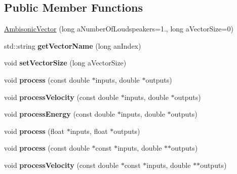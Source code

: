 \subsection*{Public Member Functions}
\begin{DoxyCompactItemize}
\item 
\hyperlink{class_ambisonic_vector_ae4c02b111015ca551b50676e9989e5e1}{Ambisonic\-Vector} (long a\-Number\-Of\-Loudspeakers=1., long a\-Vector\-Size=0)
\item 
\hypertarget{class_ambisonic_vector_aa6057320355238b4afbd1fa2293aca6e}{std\-::string {\bfseries get\-Vector\-Name} (long an\-Index)}\label{class_ambisonic_vector_aa6057320355238b4afbd1fa2293aca6e}

\item 
\hypertarget{class_ambisonic_vector_a63af1b74b95a54082cf318d26ee919b9}{void {\bfseries set\-Vector\-Size} (long a\-Vector\-Size)}\label{class_ambisonic_vector_a63af1b74b95a54082cf318d26ee919b9}

\item 
\hypertarget{class_ambisonic_vector_abc045ea322659b1441d9f5b764950b43}{void {\bfseries process} (const double $\ast$inputs, double $\ast$outputs)}\label{class_ambisonic_vector_abc045ea322659b1441d9f5b764950b43}

\item 
\hypertarget{class_ambisonic_vector_ac3c2eb9b1d2a69ad961ab4256f6fe972}{void {\bfseries process\-Velocity} (const double $\ast$inputs, double $\ast$outputs)}\label{class_ambisonic_vector_ac3c2eb9b1d2a69ad961ab4256f6fe972}

\item 
\hypertarget{class_ambisonic_vector_a6c583cac87046e36245e8cb9e7786855}{void {\bfseries process\-Energy} (const double $\ast$inputs, double $\ast$outputs)}\label{class_ambisonic_vector_a6c583cac87046e36245e8cb9e7786855}

\item 
\hypertarget{class_ambisonic_vector_a3db1780373d30e0d699ea5150b70a0a4}{void {\bfseries process} (float $\ast$inputs, float $\ast$outputs)}\label{class_ambisonic_vector_a3db1780373d30e0d699ea5150b70a0a4}

\item 
\hypertarget{class_ambisonic_vector_a73d58a17354ea79881a5a460b0bdf944}{void {\bfseries process} (const double $\ast$const $\ast$inputs, double $\ast$$\ast$outputs)}\label{class_ambisonic_vector_a73d58a17354ea79881a5a460b0bdf944}

\item 
\hypertarget{class_ambisonic_vector_a2d7f76ae4d2a725ba76b9c7956df4611}{void {\bfseries process\-Velocity} (const double $\ast$const $\ast$inputs, double $\ast$$\ast$outputs)}\label{class_ambisonic_vector_a2d7f76ae4d2a725ba76b9c7956df4611}


\end{DoxyCompactItemize}
